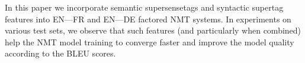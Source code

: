 In this paper we incorporate semantic supersensetags and syntactic supertag features into EN---FR and EN---DE factored NMT systems. In experiments on various test sets, we observe that such features (and particularly when combined) help the NMT  model training to converge faster and improve the model quality according to the BLEU scores.
